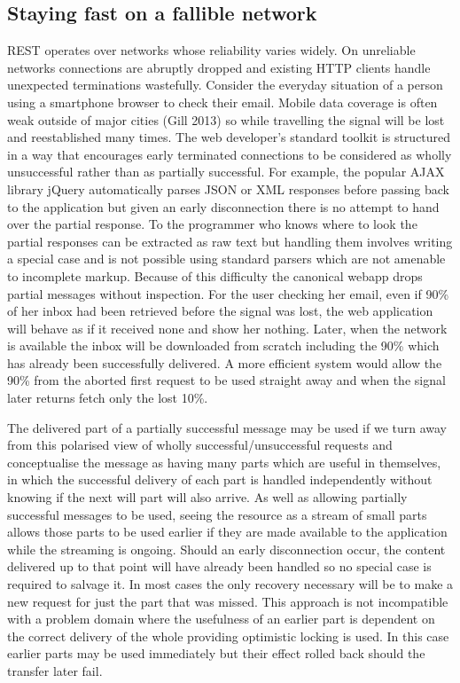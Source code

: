\documentclass[12pt, ]{article}
\begin{document}
\subsection{Staying fast on a fallible
network}\label{staying-fast-on-a-fallible-network}

REST operates over networks whose reliability varies widely. On
unreliable networks connections are abruptly dropped and existing HTTP
clients handle unexpected terminations wastefully. Consider the everyday
situation of a person using a smartphone browser to check their email.
Mobile data coverage is often weak outside of major cities (Gill 2013)
so while travelling the signal will be lost and reestablished many
times. The web developer's standard toolkit is structured in a way that
encourages early terminated connections to be considered as wholly
unsuccessful rather than as partially successful. For example, the
popular AJAX library jQuery automatically parses JSON or XML responses
before passing back to the application but given an early disconnection
there is no attempt to hand over the partial response. To the programmer
who knows where to look the partial responses can be extracted as raw
text but handling them involves writing a special case and is not
possible using standard parsers which are not amenable to incomplete
markup. Because of this difficulty the canonical webapp drops partial
messages without inspection. For the user checking her email, even if
90\% of her inbox had been retrieved before the signal was lost, the web
application will behave as if it received none and show her nothing.
Later, when the network is available the inbox will be downloaded from
scratch including the 90\% which has already been successfully
delivered. A more efficient system would allow the 90\% from the aborted
first request to be used straight away and when the signal later returns
fetch only the lost 10\%.

The delivered part of a partially successful message may be used if we
turn away from this polarised view of wholly successful/unsuccessful
requests and conceptualise the message as having many parts which are
useful in themselves, in which the successful delivery of each part is
handled independently without knowing if the next will part will also
arrive. As well as allowing partially successful messages to be used,
seeing the resource as a stream of small parts allows those parts to be
used earlier if they are made available to the application while the
streaming is ongoing. Should an early disconnection occur, the content
delivered up to that point will have already been handled so no special
case is required to salvage it. In most cases the only recovery
necessary will be to make a new request for just the part that was
missed. This approach is not incompatible with a problem domain where
the usefulness of an earlier part is dependent on the correct delivery
of the whole providing optimistic locking is used. In this case earlier
parts may be used immediately but their effect rolled back should the
transfer later fail.
\end{document}

